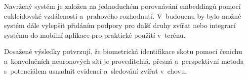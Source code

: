 Navržený systém je založen na jednoduchém porovnávání embeddingů pomocí eukleidovské vzdálenosti a~prahového rozhodnutí. V~budoucnu by bylo možné systém dále vylepšit přidáním podpory pro další druhy zvířat nebo integrací systému do mobilní aplikace pro praktické použití v~terénu.

Dosažené výsledky potvrzují, že biometrická identifikace skotu pomocí čenichu a~konvolučních neuronových sítí je proveditelná, přesná a~perspektivní metoda s~potenciálem usnadnit evidenci a~sledování zvířat v~chovu.




%
